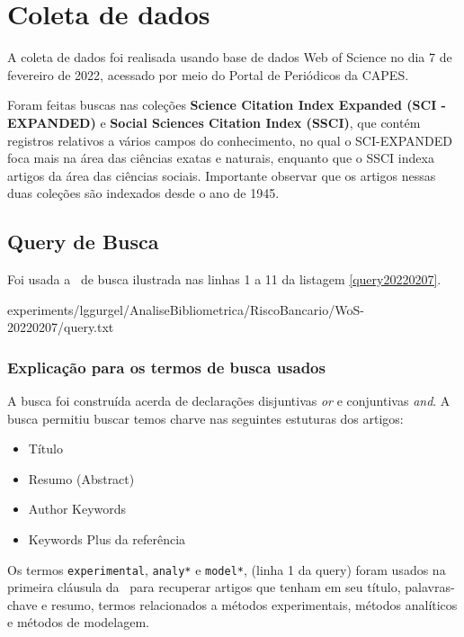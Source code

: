 \section{Coleta de dados\label{RCBSIA:coleta}}

A coleta de dados foi realisada usando base de dados Web of Science no dia 7 de fevereiro de 2022, acessado por meio do Portal de Periódicos da CAPES.

Foram feitas buscas nas coleções \textbf{Science  Citation  Index  Expanded (SCI -EXPANDED)} e \textbf{Social  Sciences  Citation  Index (SSCI)}, que contém registros relativos a vários campos do conhecimento, no qual o SCI-EXPANDED foca mais na área das ciências exatas e naturais, enquanto que o SSCI indexa artigos da área das ciências sociais. Importante observar que os artigos nessas duas coleções são indexados desde o ano de 1945. 

\subsection{Query de Busca}

Foi usada a \query\  de busca ilustrada nas linhas 1 a 11 da listagem \ref{query20220207}.


{experiments/lggurgel/AnaliseBibliometrica/RiscoBancario/WoS-20220207/query.txt}

\subsubsection{Explicação para os termos de busca usados\label{RCBSIA:query}}

A busca foi construída acerda de declarações disjuntivas \textit{or} e conjuntivas \textit{and}. A busca permitiu buscar temos charve nas seguintes estuturas dos artigos:
\begin{itemize}
    \item Título 
    \item Resumo (Abstract)
    \item Author Keywords
    \item Keywords Plus da referência
\end{itemize}

Os termos \texttt{experimental}, \texttt{analy*} e \texttt{model*}, (linha 1 da query) foram usados na primeira cláusula da \query\  para recuperar artigos que tenham em seu título, palavras-chave e resumo, termos relacionados a métodos experimentais,
métodos analíticos e métodos de modelagem.

